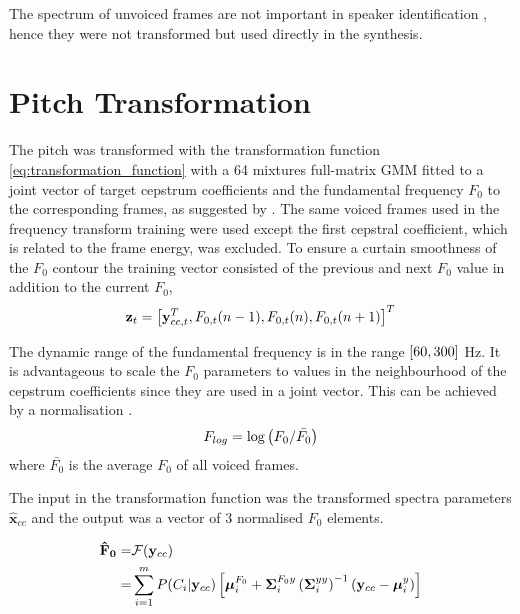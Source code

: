 The spectrum of unvoiced frames are not important in speaker identification , hence they were not transformed but used directly in the synthesis.

\section{Pitch Transformation} %
\label{sec:pitch_transformation}

The pitch was transformed with the transformation function \eqref{eq:transformation_function} with a 64 mixtures full-matrix GMM fitted to a joint vector of target cepstrum coefficients and the fundamental frequency $F_0$ to the corresponding frames, as suggested by \cite{najjary03new}. The same voiced frames used in the frequency transform training were used except the first cepstral coefficient, which is related to the frame energy, was excluded. To ensure a curtain smoothness of the $F_0$ contour the training vector consisted of the previous and next $F_0$ value in addition to the current $F_0$,
\begin{equation}
	\mathbf{z}_t = \left[\mathbf{y}_{cc,t}^T, F_{0,t}(n-1), F_{0,t}(n), F_{0,t}(n+1)\right]^T 
\end{equation}

The dynamic range of the fundamental frequency is in the range $\left[60,300\right]$ Hz. It is advantageous to scale the $F_0$ parameters to values in the neighbourhood of the cepstrum coefficients since they are used in a joint vector. This can be achieved by a normalisation \cite{najjary03new}.
\begin{equation}
	F_{log} = \log \left(F_0/\bar{F_0}\right)
\end{equation}
where $\bar{F_0}$ is the average $F_0$ of all voiced frames.

The input in the transformation function was the transformed spectra parameters $\hat{\mathbf{x}}_{cc}$ and the output was a vector of 3 normalised $F_0$ elements.

\begin{equation}
	\label{eq:pitch_transformation}
	\begin{split}
		\mathbf{\hat{F}_0} =& \mathcal F(\mathbf{y}_{cc})\\
		=& \sum_{i=1}^{m}P(C_i \vert \mathbf{y}_{cc}) \left[\boldsymbol{\mu}_i^{F_0} + \mathbf{\Sigma}_i^{F_0y} \left(\mathbf{\Sigma}_i^{yy}\right)^{-1} (\mathbf{y}_{cc}-\boldsymbol{\mu}_i^y)\right]
	\end{split}
\end{equation}

